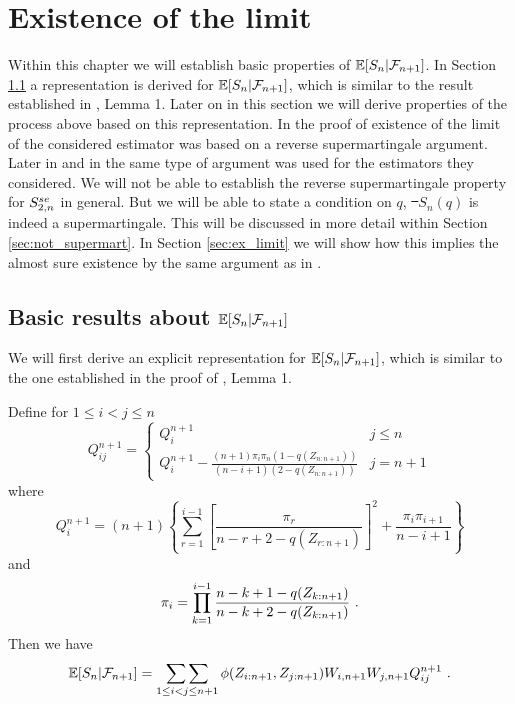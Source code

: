 \chapter{Existence of the limit}

Within this chapter we will establish basic properties of $\mathbb{E}[S_n|\mathcal{F}_{n+1}]$. In Section \ref{sec:representation} a representation is derived for $\mathbb{E}[S_n|\mathcal{F}_{n+1}]$, which is similar to the result established in \cite{bose1999strong}, Lemma 1. Later on in this section we will derive properties of the process above based on this representation. In \cite{stute1993strong} the proof of existence of the limit of the considered estimator was based on a reverse supermartingale argument. Later in \cite{dikta2000strong} and in \cite{bose1999strong} the same type of argument was used for the estimators they considered. We will not be able to establish the reverse supermartingale property for $S_{2,n}^{se}$ in general. But we will be able to state a condition on $q$, \st\ $S_n(q)$ is indeed a supermartingale. This will be discussed in more detail within Section \ref{sec:not_supermart}. In Section \ref{sec:ex_limit} we will show how this implies the almost sure existence by the same argument as in \cite{stute1993strong}.
%
%
%
\section{Basic results about $\mathbb{E}[S_{n}|\mathcal{F}_{n+1}]$} \label{sec:representation}
%
We will first derive an explicit representation for $\mathbb{E}[S_{n}|\mathcal{F}_{n+1}]$, which is similar to the one established in the proof of \cite{bose1999strong}, Lemma 1.
\begin{lemma} \label{lem:qi}
Define for $1\leq i<j\leq n$
\[Q_{ij}^{n+1} = \begin{cases} 
      Q_i^{n+1} & j\leq n \\
      Q_i^{n+1} - \frac{(n+1)\pi_i \pi_n (1-q(Z_{n:n+1}))}{(n-i+1)(2-q(Z_{n:n+1}))} & j=n+1
   \end{cases}
\]
%
where
\begin{equation}
	Q_i^{n+1} = (n+1) \left\{ \sum\limits_{r=1}^{i-1} \left[ \frac{\pi_r}{n-r+2-q(Z_{r:n+1})} \right]^2 + \frac{\pi_i\pi_{i+1}}{n-i+1} \right\}
	\label{eq:qi}
\end{equation}
and 
$$\pi_i = \prod\limits_{k=1}^{i-1} \frac{n-k+1-q(Z_{k:n+1})}{n-k+2-q(Z_{k:n+1})}\textrm{ .}$$
Then we have
$$\mathbb{E}[S_{n}|\mathcal{F}_{n+1}] = \mathop{\sum\sum}\limits_{1\leq i<j \leq n+1} \phi(Z_{i:n+1},Z_{j:n+1}) W_{i,n+1}W_{j,n+1}Q_{ij}^{n+1}\textrm{ .}$$
\end{lemma}

